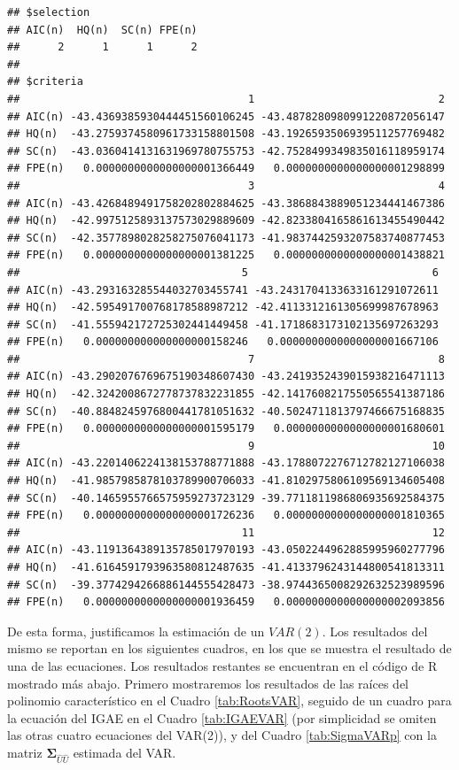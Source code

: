 \documentclass[
]{book}
\begin{document}
\begin{verbatim}
## $selection
## AIC(n)  HQ(n)  SC(n) FPE(n) 
##      2      1      1      2 
## 
## $criteria
##                                    1                             2
## AIC(n) -43.4369385930444451560106245 -43.4878280980991220872056147
## HQ(n)  -43.2759374580961733158801508 -43.1926593506939511257769482
## SC(n)  -43.0360414131631969780755753 -42.7528499349835016118959174
## FPE(n)   0.0000000000000000001366449   0.0000000000000000001298899
##                                    3                             4
## AIC(n) -43.4268489491758202802884625 -43.3868843889051234441467386
## HQ(n)  -42.9975125893137573029889609 -42.8233804165861613455490442
## SC(n)  -42.3577898028258275076041173 -41.9837442593207583740877453
## FPE(n)   0.0000000000000000001381225   0.0000000000000000001438821
##                                   5                             6
## AIC(n) -43.293163285544032703455741 -43.2431704133633161291072611
## HQ(n)  -42.595491700768178588987212 -42.4113312161305699987678963
## SC(n)  -41.555942172725302441449458 -41.1718683173102135697263293
## FPE(n)   0.000000000000000000158246   0.0000000000000000001667106
##                                    7                             8
## AIC(n) -43.2902076769675190348607430 -43.2419352439015938216471113
## HQ(n)  -42.3242008672778737832231855 -42.1417608217550565541387186
## SC(n)  -40.8848245976800441781051632 -40.5024711813797466675168835
## FPE(n)   0.0000000000000000001595179   0.0000000000000000001680601
##                                    9                            10
## AIC(n) -43.2201406224138153788771888 -43.1788072276712782127106038
## HQ(n)  -41.9857985878103789900706033 -41.8102975806109569134605408
## SC(n)  -40.1465955766575959273723129 -39.7711811986806935692584375
## FPE(n)   0.0000000000000000001726236   0.0000000000000000001810365
##                                   11                            12
## AIC(n) -43.1191364389135785017970193 -43.0502244962885995960277796
## HQ(n)  -41.6164591793963580812487635 -41.4133796243144800541813311
## SC(n)  -39.3774294266886144555428473 -38.9744365008292632523989596
## FPE(n)   0.0000000000000000001936459   0.0000000000000000002093856
\end{verbatim}

De esta forma, justificamos la estimación de un \(VAR(2)\). Los resultados del mismo se reportan en los siguientes cuadros, en los que se muestra el resultado de una de las ecuaciones. Los resultados restantes se encuentran en el código de R mostrado más abajo. Primero mostraremos los resultados de las raíces del polinomio característico en el Cuadro \ref{tab:RootsVAR}, seguido de un cuadro para la ecuación del IGAE en el Cuadro \ref{tab:IGAEVAR} (por simplicidad se omiten las otras cuatro ecuaciones del VAR(2)), y del Cuadro \ref{tab:SigmaVARp} con la matriz \(\mathbf{\Sigma}_{\hat{U}\hat{U}}\) estimada del VAR.
\end{document}
